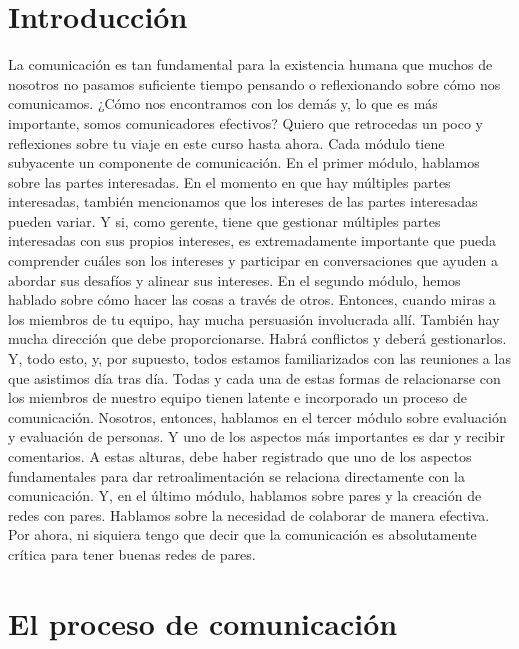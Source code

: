 \documentclass[10pt]{book}
\begin{document}
\section{Introducción}
La comunicación es tan fundamental para la existencia humana que muchos de nosotros no pasamos suficiente tiempo pensando o reflexionando sobre cómo nos comunicamos. ¿Cómo nos encontramos con los demás y, lo que es más importante, somos comunicadores efectivos? Quiero que retrocedas un poco y reflexiones sobre tu viaje en este curso hasta ahora. Cada módulo tiene subyacente un componente de comunicación. En el primer módulo, hablamos sobre las partes interesadas. En el momento en que hay múltiples partes interesadas, también mencionamos que los intereses de las partes interesadas pueden variar. Y si, como gerente, tiene que gestionar múltiples partes interesadas con sus propios intereses, es extremadamente importante que pueda comprender cuáles son los intereses y participar en conversaciones que ayuden a abordar sus desafíos y alinear sus intereses. En el segundo módulo, hemos hablado sobre cómo hacer las cosas a través de otros. Entonces, cuando miras a los miembros de tu equipo, hay mucha persuasión involucrada allí. También hay mucha dirección que debe proporcionarse. Habrá conflictos y deberá gestionarlos. Y, todo esto, y, por supuesto, todos estamos familiarizados con las reuniones a las que asistimos día tras día. Todas y cada una de estas formas de relacionarse con los miembros de nuestro equipo tienen latente e incorporado un proceso de comunicación. Nosotros, entonces, hablamos en el tercer módulo sobre evaluación y evaluación de personas. Y uno de los aspectos más importantes es dar y recibir comentarios. A estas alturas, debe haber registrado que uno de los aspectos fundamentales para dar retroalimentación se relaciona directamente con la comunicación. Y, en el último módulo, hablamos sobre pares y la creación de redes con pares. Hablamos sobre la necesidad de colaborar de manera efectiva. Por ahora, ni siquiera tengo que decir que la comunicación es absolutamente crítica para tener buenas redes de pares.

\section{El proceso de comunicación}
\end{document}
